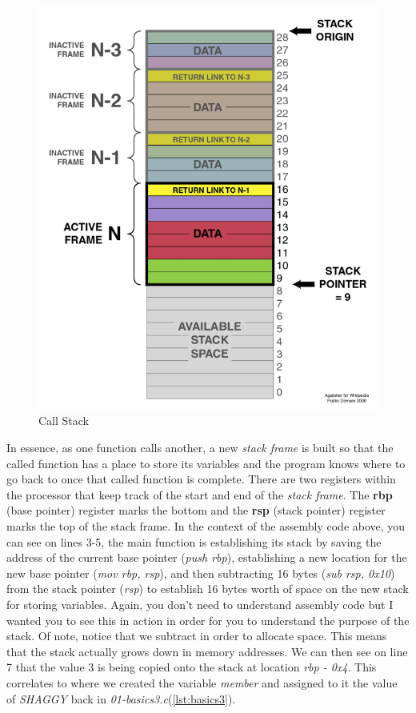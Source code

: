 \documentclass[../main.tex]{subfiles}
\begin{document}
	\begin{figure}[h]
		\centering\includegraphics[scale=0.3]{callstack.png}
		\caption{Call Stack}
		\label{fig:callstack}
	\end{figure}

	In essence, as one function calls another, a new \textit{stack frame} is built so that the called function has a place to store its variables and the program knows where to go back to once that called function is complete.  There are two registers within the processor that keep track of the start and end of the \textit{stack frame}.  The \textbf{rbp} (base pointer)  register marks the bottom and the \textbf{rsp} (stack pointer) register marks the top of the stack frame.  In the context of the assembly code above, you can see on lines 3-5, the main function is establishing its stack by saving the address of the current base pointer (\textit{push rbp}), establishing a new location for the new base pointer (\textit{mov rbp, rsp}), and then subtracting 16 bytes (\textit{sub rsp, 0x10}) from the stack pointer (\textit{rsp}) to establish 16 bytes worth of space on the new stack for storing variables.  Again, you don't need to understand assembly code but I wanted you to see this in action in order for you to understand the purpose of the stack.  Of note, notice that we subtract in order to allocate space.  This means that the stack actually grows down in memory addresses.  We can then see on line 7 that the value 3 is being copied onto the stack at location \textit{rbp - 0x4}.  This correlates to where we created the variable \textit{member} and assigned to it the value of \textit{SHAGGY} back in \textit{01-basics3.c}(\ref{lst:basics3}).
	
\end{document}
